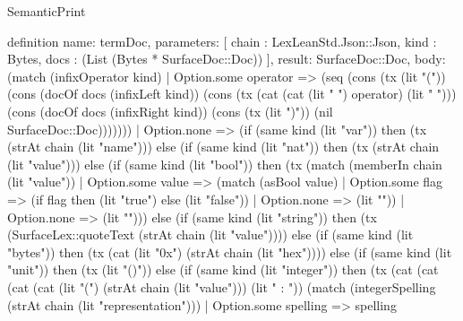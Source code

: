\begin{lexlean}{SemanticPrint}
\begin{semanticmodule}
definition{
  name: termDoc,
  parameters: [
    chain : LexLeanStd.Json::Json,
    kind : Bytes,
    docs : (List (Bytes * SurfaceDoc::Doc))
  ],
  result: SurfaceDoc::Doc,
  body: (match (infixOperator kind)
    | Option.some operator => (seq (cons (tx (lit "(")) (cons (docOf docs (infixLeft kind)) (cons (tx (cat (cat (lit " ") operator) (lit " "))) (cons (docOf docs (infixRight kind)) (cons (tx (lit ")")) (nil SurfaceDoc::Doc)))))))
    | Option.none => (if (same kind (lit "var")) then (tx (strAt chain (lit "name"))) else (if (same kind (lit "nat")) then (tx (strAt chain (lit "value"))) else (if (same kind (lit "bool")) then (tx (match (memberIn chain (lit "value"))
      | Option.some value => (match (asBool value)
        | Option.some flag => (if flag then (lit "true") else (lit "false"))
        | Option.none => (lit ""))
      | Option.none => (lit ""))) else (if (same kind (lit "string")) then (tx (SurfaceLex::quoteText (strAt chain (lit "value")))) else (if (same kind (lit "bytes")) then (tx (cat (lit "0x") (strAt chain (lit "hex")))) else (if (same kind (lit "unit")) then (tx (lit "()")) else (if (same kind (lit "integer")) then (tx (cat (cat (cat (cat (lit "(") (strAt chain (lit "value"))) (lit " : ")) (match (integerSpelling (strAt chain (lit "representation")))
      | Option.some spelling => spelling
}
\end{semanticmodule}
\end{lexlean}
